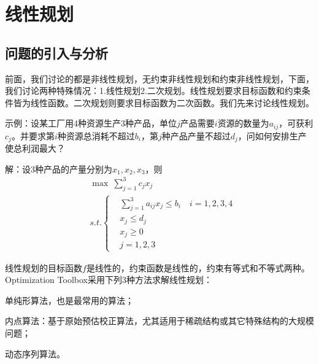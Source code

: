 
\chapter{线性规划}

\section{问题的引入与分析}
    \par
    前面，我们讨论的都是非线性规划，无约束非线性规划和约束非线性规划，下面，我们讨论两种特殊情况：1.线性规划2.二次规划。线性规划要求目标函数和约束条件皆为线性函数。二次规划则要求目标函数为二次函数。我们先来讨论线性规划。
    \par
    示例：设某工厂用4种资源生产3种产品，单位$j$产品需要$i$资源的数量为$a_{ij}$，可获利$c_j$。并要求第$i$种资源总消耗不超过$b_i$，第$j$种产品产量不超过$d_j$，问如何安排生产使总利润最大？
    \par
    解：设3种产品的产量分别为$x_1,x_2,x_3$，则
    \begin{align*}
    &{\max}\ \mathop{\sum}\limits_{j=1}^3c_jx_j\\
    &s.t.\left\{
    \begin{aligned}
    &\mathop{\sum}\limits_{j=1}^3a_{ij}x_j \leqslant b_i\quad i=1,2,3,4\\
    &x_j \leqslant d_j\\
    &x_j \geqslant 0\\
    &j=1,2,3
    \end{aligned}
    \right.
    \end{align*}
    \par
    线性规划的目标函数$f$是线性的，约束函数是线性的，约束有等式和不等式两种。Optimization Toolbox采用下列3种方法求解线性规划：
    \par
    单纯形算法，也是最常用的算法；
    \par
    内点算法：基于原始预估校正算法，尤其适用于稀疏结构或其它特殊结构的大规模问题；
    \par
    动态序列算法。
